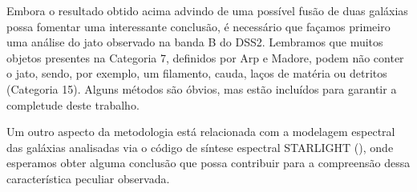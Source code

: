 Embora o resultado obtido acima advindo de uma possível fusão de duas galáxias possa fomentar uma interessante conclusão, é necessário que façamos primeiro uma análise do jato observado na banda B do DSS2. Lembramos que muitos objetos presentes na Categoria 7, definidos por Arp e Madore, podem não conter o jato, sendo, por exemplo, um filamento, cauda, laços de matéria ou detritos (Categoria 15). Alguns métodos são óbvios, mas estão incluídos para garantir a completude deste trabalho.

Um outro aspecto da metodologia está relacionada com a modelagem espectral das galáxias analisadas via o código de síntese espectral STARLIGHT (\cite{cid2004star,fernandes2005semi,asari2007history}), onde esperamos obter alguma conclusão que possa contribuir para a compreensão dessa característica peculiar observada.

